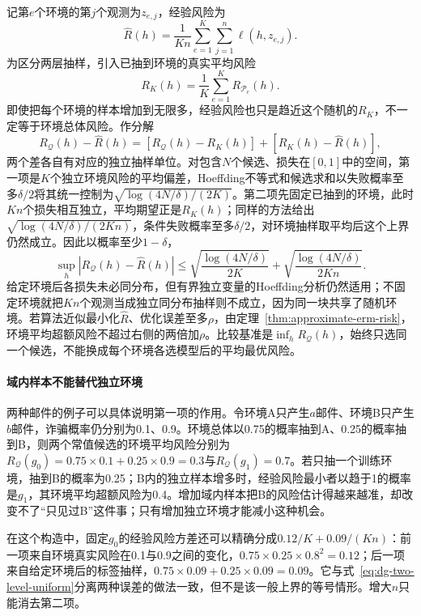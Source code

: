 记第$e$个环境的第$j$个观测为$z_{e,j}$，经验风险为
\[
 \widehat R(h)=\frac1{Kn}\sum_{e=1}^K\sum_{j=1}^n\ell(h,z_{e,j}).
\]
为区分两层抽样，引入已抽到环境的真实平均风险
\[
 R_K(h)=\frac1K\sum_{e=1}^K R_{\mathcal P_e}(h).
\]即使把每个环境的样本增加到无限多，经验风险也只是趋近这个随机的$R_K$，不一定等于环境总体风险。作分解
\[
 R_{\mathcal Q}(h)-\widehat R(h)
 =[R_{\mathcal Q}(h)-R_K(h)]+[R_K(h)-\widehat R(h)] ,
\]
两个差各自有对应的独立抽样单位。对包含$N$个候选、损失在$[0,1]$中的空间，第一项是$K$个独立环境风险的平均偏差，Hoeffding不等式和候选求和以失败概率至多$\delta/2$将其统一控制为$\sqrt{\log(4N/\delta)/(2K)}$。第二项先固定已抽到的环境，此时$Kn$个损失相互独立，平均期望正是$R_K(h)$；同样的方法给出$\sqrt{\log(4N/\delta)/(2Kn)}$，条件失败概率至多$\delta/2$，对环境抽样取平均后这个上界仍然成立。因此以概率至少$1-\delta$，
\begin{equation}
 \sup_h|R_{\mathcal Q}(h)-\widehat R(h)|
 \leq\sqrt{\frac{\log(4N/\delta)}{2K}}
     +\sqrt{\frac{\log(4N/\delta)}{2Kn}}.
 \label{eq:dg-two-level-uniform}
\end{equation}
给定环境后各损失未必同分布，但有界独立变量的Hoeffding分析仍然适用；不固定环境就把$Kn$个观测当成独立同分布抽样则不成立，因为同一块共享了随机环境。若算法近似最小化$\widehat R$、优化误差至多$\rho$，由定理~\ref{thm:approximate-erm-risk}，环境平均超额风险不超过右侧的两倍加$\rho$。比较基准是$\inf_hR_{\mathcal Q}(h)$，始终只选同一个候选，不能换成每个环境各选模型后的平均最优风险。

\paragraph{域内样本不能替代独立环境}
两种邮件的例子可以具体说明第一项的作用。令环境A只产生$a$邮件、环境B只产生$b$邮件，诈骗概率仍分别为0.1、0.9。环境总体以0.75的概率抽到A、0.25的概率抽到B，则两个常值候选的环境平均风险分别为$R_{\mathcal Q}(g_0)=0.75\times0.1+0.25\times0.9=0.3$与$R_{\mathcal Q}(g_1)=0.7$。若只抽一个训练环境，抽到B的概率为0.25；B内的独立样本增多时，经验风险最小者以趋于1的概率是$g_1$，其环境平均超额风险为0.4。增加域内样本把B的风险估计得越来越准，却改变不了“只见过B”这件事；只有增加独立环境才能减小这种机会。

在这个构造中，固定$g_0$的经验风险方差还可以精确分成$0.12/K+0.09/(Kn)$：前一项来自环境真实风险在0.1与0.9之间的变化，$0.75\times0.25\times0.8^2=0.12$；后一项来自给定环境后的标签抽样，$0.75\times0.09+0.25\times0.09=0.09$。它与式~\eqref{eq:dg-two-level-uniform}分离两种误差的做法一致，但不是该一般上界的等号情形。增大$n$只能消去第二项。

